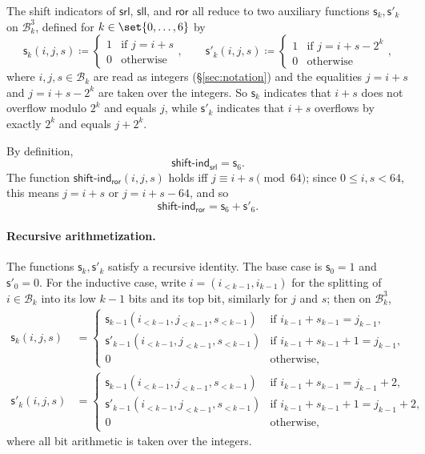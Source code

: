 \documentclass{article}
\theoremstyle{definition}
\newcommand{\BB}{\mathcal{B}}
\begin{document}
The shift indicators of $\textsf{srl}$, $\textsf{sll}$, and $\textsf{ror}$ all reduce to two auxiliary functions $\mathsf{s}_k, \mathsf{s}'_k$ on $\BB_k^3$, defined for $k \in \set{0, \ldots, 6}$ by
\[
  \mathsf{s}_k(i, j, s) \coloneqq \begin{cases} 1 & \text{if } j = i + s \\ 0 & \text{otherwise} \end{cases}, \qquad \mathsf{s}'_k(i, j, s) \coloneqq \begin{cases} 1 & \text{if } j = i + s - 2^k \\ 0 & \text{otherwise} \end{cases},
\]
where $i, j, s \in \BB_k$ are read as integers (\S\ref{sec:notation}) and the equalities $j = i + s$ and $j = i + s - 2^k$ are taken over the integers. So $\mathsf{s}_k$ indicates that $i + s$ does not overflow modulo $2^k$ and equals $j$, while $\mathsf{s}'_k$ indicates that $i + s$ overflows by exactly $2^k$ and equals $j + 2^k$.

By definition,
\[
  \textsf{shift-ind}_\textsf{srl} = \mathsf{s}_6.
\]
The function $\textsf{shift-ind}_\textsf{ror}(i, j, s)$ holds iff $j \equiv i + s \pmod{64}$; since $0 \leq i, s < 64$, this means $j = i + s$ or $j = i + s - 64$, and so
\[
  \textsf{shift-ind}_\textsf{ror} = \mathsf{s}_6 + \mathsf{s}'_6.
\]

\paragraph{Recursive arithmetization.}
The functions $\mathsf{s}_k, \mathsf{s}'_k$ satisfy a recursive identity. The base case is $\mathsf{s}_0 = 1$ and $\mathsf{s}'_0 = 0$. For the inductive case, write $i = (i_{<k-1}, i_{k-1})$ for the splitting of $i \in \BB_k$ into its low $k - 1$ bits and its top bit, similarly for $j$ and $s$; then on $\BB_k^3$,
\begin{align*}
  \mathsf{s}_k(i, j, s) &= \begin{cases} \mathsf{s}_{k - 1}(i_{<k-1}, j_{<k-1}, s_{<k-1}) & \text{if } i_{k - 1} + s_{k - 1} = j_{k - 1}, \\ \mathsf{s}'_{k - 1}(i_{<k-1}, j_{<k-1}, s_{<k-1}) & \text{if } i_{k - 1} + s_{k - 1} + 1 = j_{k - 1}, \\ 0 & \text{otherwise}, \end{cases} \\
  \mathsf{s}'_k(i, j, s) &= \begin{cases} \mathsf{s}_{k - 1}(i_{<k-1}, j_{<k-1}, s_{<k-1}) & \text{if } i_{k - 1} + s_{k - 1} = j_{k - 1} + 2, \\ \mathsf{s}'_{k - 1}(i_{<k-1}, j_{<k-1}, s_{<k-1}) & \text{if } i_{k - 1} + s_{k - 1} + 1 = j_{k - 1} + 2, \\ 0 & \text{otherwise}, \end{cases}
\end{align*}
where all bit arithmetic is taken over the integers.
\end{document}

